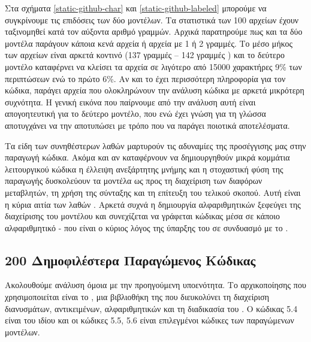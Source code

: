 Στα σχήματα \ref{static-github-char} και \ref{static-github-labeled} μπορούμε να συγκρίνουμε τις επιδόσεις των δύο μοντέλων.
Τα στατιστικά των 100 αρχείων έχουν ταξινομηθεί κατά τον αύξοντα αριθμό γραμμών.
Αρχικά παρατηρούμε πως και τα δύο μοντέλα παράγουν κάποια κενά αρχεία ή αρχεία με 1 ή 2 γραμμές.
Το μέσο μήκος των αρχείων είναι αρκετά κοντινό (137 γραμμές  -- 142 γραμμές ) και το δεύτερο μοντέλο καταφέρνει να κλείσει τα αρχεία σε λιγότερο από 15000 χαρακτήρες 9\% των περιπτώσεων ενώ το πρώτο 6\%.
Αν και το  έχει περισσότερη πληροφορία για τον κώδικα, παράγει αρχεία που ολοκληρώνουν την ανάλυση κώδικα με αρκετά μικρότερη συχνότητα.
Η γενική εικόνα που παίρνουμε από την ανάλυση αυτή είναι απογοητευτική για το δεύτερο μοντέλο, που ενώ έχει  γνώση για τη γλώσσα αποτυγχάνει να την αποτυπώσει με τρόπο που να παράγει ποιοτικά αποτελέσματα.

Τα είδη των συνηθέστερων λαθών μαρτυρούν τις αδυναμίες της προσέγγισης μας στην παραγωγή κώδικα.
Ακόμα και αν καταφέρνουν να δημιουργηθούν μικρά κομμάτια λειτουργικού κώδικα η έλλειψη ανεξάρτητης μνήμης και η στοχαστική φύση της παραγωγής δυσκολεύουν τα μοντέλα ως προς τη διαχείριση των διαφόρων μεταβλητών, τη χρήση της σύνταξης και τη επίτευξη του τελικού σκοπού.
Αυτή είναι η κύρια αιτία των λαθών .
Αρκετά συχνά η δημιουργία αλφαριθμητικών ξεφεύγει της διαχείρισης του μοντέλου και συνεχίζεται να γράφεται κώδικας μέσα σε κάποιο αλφαριθμητικό - που είναι ο κύριος λόγος της ύπαρξης του  σε συνδυασμό με το .

\subsection{200 Δημοφιλέστερα  Παραγώμενος Κώδικας}

Ακολουθούμε ανάλυση όμοια με την προηγούμενη υποενότητα.
Το  αρχικοποίησης που χρησιμοποιείται είναι το , μια βιβλιοθήκη της  που διευκολύνει τη διαχείριση διανυσμάτων, αντικειμένων, αλφαριθμητικών και τη διαδικασία του . Ο κώδικας 5.4 είναι του ιδίου  και οι κώδικες 5.5, 5.6 είναι επιλεγμένοι κώδικες των παραγώμενων μοντέλων. 

\newpage
{}


